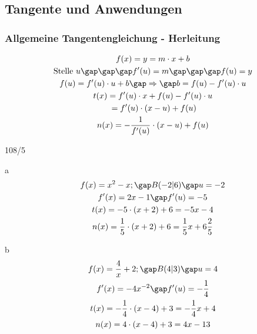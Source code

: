 \subsection{Tangente und Anwendungen}
\subsubsection{Allgemeine Tangentengleichung - Herleitung}
\begin{gather*}
  f(x) = y = m \cdot x + b \\
  \text{Stelle } u \gap\gap\gap f'(u) = m \gap\gap\gap f(u) = y \\
  f(u) = f'(u) \cdot u + b \gap\Rightarrow\gap b = f(u) - f'(u) \cdot u \\
  t(x) = f'(u) \cdot x + f(u) - f'(u) \cdot u \\
  \;= f'(u) \cdot (x - u) + f(u) \\
  n(x) = -\frac{1}{f'(u)} \cdot (x - u) + f(u)
\end{gather*}
\begin{exercise}{108/5}
  \item [a]
  \begin{gather*}
    f(x) = x^2 - x; \gap B(-2|6) \gap u = -2 \\
    f'(x) = 2x - 1 \gap f'(u) = -5 \\
    t(x) = -5 \cdot (x + 2) + 6 = -5x - 4 \\
    n(x) = \frac{1}{5} \cdot (x + 2) + 6 = \frac{1}{5}x + 6\frac{2}{5}
  \end{gather*}
  \item [b]
  \begin{gather*}
    f(x) = \frac{4}{x} + 2; \gap B(4|3) \gap u = 4 \\
    f'(x) = -4x^{-2} \gap f'(u) = -\frac{1}{4} \\
    t(x) = -\frac{1}{4} \cdot (x - 4) + 3 = -\frac{1}{4}x + 4 \\
    n(x) = 4 \cdot (x - 4) + 3 = 4x - 13
  \end{gather*}
\end{exercise}
